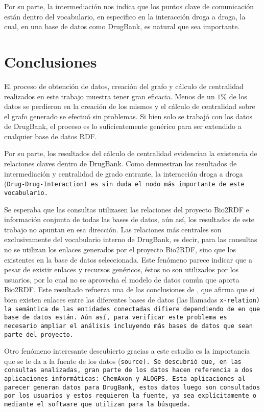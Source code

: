 Por su parte, la intermediación nos indica que los puntos clave de comunicación
están dentro del vocabulario, en especifico en la interacción droga a droga, la
cual, en una base de datos como DrugBank, es natural que sea importante.

\section{Conclusiones}\label{sec:con}
El proceso de obtención de datos, creación del grafo y cálculo de centralidad
realizados en este trabajo muestra tener gran eficacia. Menos de un $1\%$ de los
datos se perdieron en la creación de los mismos y el cálculo de centralidad
sobre el grafo generado se efectuó sin problemas. Si bien solo se trabajó con
los datos de DrugBank, el proceso es lo suficientemente genérico para ser
extendido a cualquier base de datos RDF.

Por su parte, los resultados del cálculo de centralidad evidencian la existencia
de relaciones claves dentro de DrugBank.
Como demuestran los resultados de intermediación y centralidad de grado
entrante, la interacción droga a droga (\tt{Drug-Drug-Interaction}) es sin duda
el nodo más importante de este vocabulario.

Se esperaba que las consultas utilizasen las relaciones del proyecto Bio2RDF e
información conjunta de todas las bases de datos, aún así, los resultados de
este trabajo no apuntan en esa dirección.
Las relaciones más centrales son exclusivamente del vocabulario interno de
DrugBank, es decir, para las consultas no se utilizan los enlaces generados por
el proyecto Bio2RDF, sino que los existentes en la base de datos seleccionada.
Este fenómeno parece indicar que a pesar de existir enlaces y recursos
genéricos, éstos no son utilizados por los usuarios, por lo cual no se
aprovecha el modelo de datos común que aporta Bio2RDF.
Este resultado refuerza una de las conclusiones de \cite{hu2015link}, que afirma
que si bien existen enlaces entre las diferentes bases de datos (las llamadas
\tt{x-relation}) la semántica de las entidades conectadas difiere dependiendo de
en que base de datos están.
Aún así, para verificar este problema es necesario ampliar el análisis
incluyendo más bases de datos que sean parte del proyecto.

Otro fenómeno interesante descubierto  gracias a este estudio es la importancia
que se le da a la fuente de los datos (\tt{source}).
Se descubrió que, en las consultas analizadas, gran parte de los datos hacen
referencia a dos aplicaciones informáticas: ChemAxon y ALOGPS.
Esta aplicaciones al parecer generan datos para DrugBank, estos datos luego son
consultados por los usuarios y estos requieren la fuente, ya sea explícitamente
o mediante el software que utilizan para la búsqueda.

